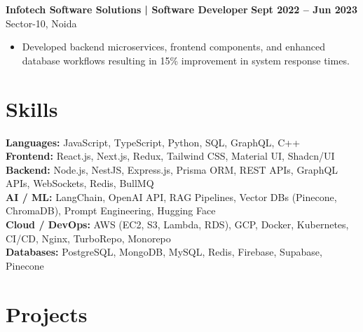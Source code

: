 \documentclass[a4paper,9pt]{article}
\begin{document}
{\vspace{0.5mm}

\textbf{Infotech Software Solutions | Software Developer}
\hfill \textbf{Sept 2022 -- Jun 2023} \\
Sector-10, Noida

\begin{itemize}
\item Developed backend microservices, frontend components, and enhanced database workflows resulting in 15\% improvement in system response times.
\end{itemize}

}

\vspace{0.5mm}


\section*{Skills}

{\footnotesize

\textbf{Languages:} JavaScript, TypeScript, Python, SQL, GraphQL, C++ \\
\textbf{Frontend:} React.js, Next.js, Redux, Tailwind CSS, Material UI, Shadcn/UI \\
\textbf{Backend:} Node.js, NestJS, Express.js, Prisma ORM, REST APIs, GraphQL APIs, WebSockets, Redis, BullMQ \\
\textbf{AI / ML:} LangChain, OpenAI API, RAG Pipelines, Vector DBs (Pinecone, ChromaDB), Prompt Engineering, Hugging Face \\
\textbf{Cloud / DevOps:} AWS (EC2, S3, Lambda, RDS), GCP, Docker, Kubernetes, CI/CD, Nginx, TurboRepo, Monorepo \\
\textbf{Databases:} PostgreSQL, MongoDB, MySQL, Redis, Firebase, Supabase, Pinecone

}

\vspace{0.5mm}


\section*{Projects}
\end{document}
